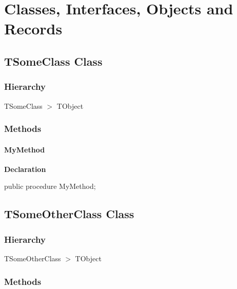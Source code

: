 \documentclass{report}
\begin{document}
\section{Classes, Interfaces, Objects and Records}
\subsection*{TSomeClass Class}
\subsubsection*{\large{\textbf{Hierarchy}}\normalsize\hspace{1ex}\hfill}
TSomeClass {$>$} TObject
\subsubsection*{\large{\textbf{Methods}}\normalsize\hspace{1ex}\hfill}
\paragraph*{MyMethod}\hspace*{\fill}

\begin{list}{}{
\setlength{\itemindent}{0cm}
\setlength{\listparindent}{0cm}
\setlength{\leftmargin}{\evensidemargin}
\addtolength{\leftmargin}{\tmplength}
\settowidth{\labelsep}{X}
\addtolength{\leftmargin}{\labelsep}
\setlength{\labelwidth}{\tmplength}
}
\begin{flushleft}
\item[\textbf{Declaration}\hfill]
\begin{ttfamily}
public procedure MyMethod;\end{ttfamily}


\end{flushleft}
\end{list}
\subsection*{TSomeOtherClass Class}
\subsubsection*{\large{\textbf{Hierarchy}}\normalsize\hspace{1ex}\hfill}
TSomeOtherClass {$>$} TObject
\subsubsection*{\large{\textbf{Methods}}\normalsize\hspace{1ex}\hfill}
\end{document}
